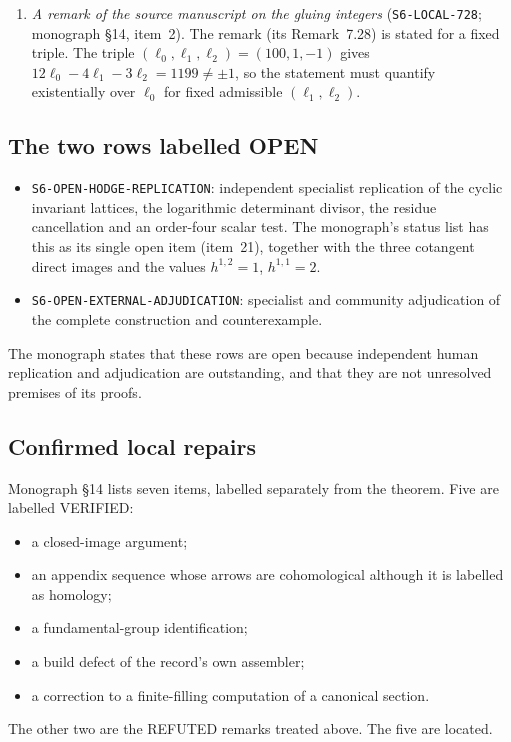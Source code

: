 \begin{enumerate}[label=\arabic*.]
\begin{itemize}
\end{itemize}
\item \emph{A remark of the source manuscript on the gluing integers} (\texttt{S6-LOCAL-728}; monograph §14, item~2). The remark (its Remark~7.28) is stated for a fixed triple. The triple $(\ell_0,\ell_1,\ell_2)=(100,1,-1)$ gives $12\ell_0-4\ell_1-3\ell_2=1199\neq\pm1$, so the statement must quantify existentially over $\ell_0$ for fixed admissible $(\ell_1,\ell_2)$. 
\end{enumerate}

\subsection{The two rows labelled \textsf{OPEN}}

\begin{itemize}
\item \texttt{S6-OPEN-HODGE-REPLICATION}: independent specialist replication of the cyclic invariant lattices, the logarithmic determinant divisor, the residue cancellation and an order-four scalar test. The monograph's status list has this as its single open item (item~21), together with the three cotangent direct images and the values $h^{1,2}=1$, $h^{1,1}=2$.
\item \texttt{S6-OPEN-EXTERNAL-ADJUDICATION}: specialist and community adjudication of the complete construction and counterexample.
\end{itemize}
The monograph states that these rows are open because independent human replication and adjudication are outstanding, and that they are not unresolved premises of its proofs.

\subsection{Confirmed local repairs}

Monograph §14 lists seven items, labelled separately from the theorem. Five are labelled \textsf{VERIFIED}:
\begin{itemize}
\item a closed-image argument;
\item an appendix sequence whose arrows are cohomological although it is labelled as homology;
\item a fundamental-group identification;
\item a build defect of the record's own assembler;
\item a correction to a finite-filling computation of a canonical section.
\end{itemize}
The other two are the \textsf{REFUTED} remarks treated above. The five are \textsf{located}.
